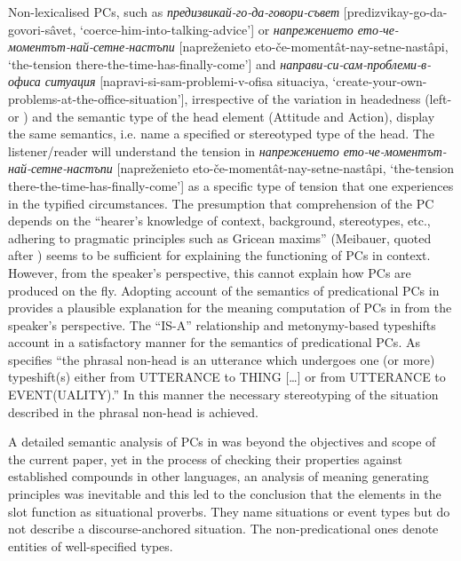 \documentclass[output=paper]{LSP/langsci}
\begin{document}
Non-lexicalised PCs, such as \textit{{предизвикай-го-да-говори-съвет} } [predizvikay-go-da-govori-sâvet, ‘coerce-him-into-talking-advice’] or \textit{{напрежението ето}-{че-моментът-най-сетне}-{настъпи}} [napreženieto eto-če-momentât-nay-setne-nas\-tâpi, ‘the-tension there-the-time-has-finally-come’] and \textit{{направи-си-сам-проб\-леми-в-офиса ситуация}} [napravi-si-sam-problemi-v-ofisa situaciya, ‘create-\linebreak your-own-problems-at-the-office-situation’], irrespective of the variation in headedness (left- or ) and the semantic type of the head element (Attitude and Action), display the same semantics, i.e. name a specified or stereotyped type of the head. The listener\slash reader will understand the tension in \textit{{напрежението ето}-{че-моментът-най-сетне}-{настъпи}} [napreženieto eto-če-momentât-nay-\linebreak setne-nastâpi, ‘the-tension there-the-time-has-finally-come’] as a specific type of tension that one experiences in the typified circumstances. The presumption that comprehension of  the PC depends on the “hearer’s knowledge of context, background, stereotypes, etc., adhering to pragmatic principles such as Gricean maxims” (Meibauer, quoted after \citealt[169]{Trips2016}) seems to be sufficient for explaining the functioning of  PCs in context. However, from the speaker’s perspective, this cannot explain how PCs are produced on the fly. Adopting  account of the semantics of predicational PCs in  provides a plausible explanation for the meaning computation of PCs in  from the speaker’s perspective. The “IS-A” relationship and metonymy-based typeshifts account in a satisfactory manner for the semantics of predicational PCs. As \citet[174]{Trips2016} specifies “the phrasal non-head is an utterance which undergoes one (or more) typeshift(s) either from UTTERANCE to THING […] or from UTTERANCE to EVENT(UALITY).” In this manner the necessary stereotyping of the situation described in the phrasal non-head is achieved.


A detailed semantic analysis of PCs in  was beyond the objectives and scope of the current paper, yet in the process of checking their properties against established compounds in other languages, an analysis of meaning generating principles was inevitable and this led to the conclusion that the elements in the  slot function as situational proverbs. They name situations or event types but do not describe a discourse-anchored situation. The non-predicational ones denote entities of well-specified types.
\end{document}
